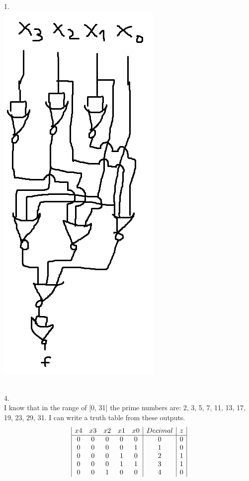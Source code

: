 \documentclass[a4paper, 20pt]{article}
\begin{document}
\begin{question}{1.}
\\ 
\leavevmode{}\hbox{\includegraphics[scale=0.75]{3d.jpg}}
\newpage

\newpage
\\ 4.
\\ I know that in the range of [0, 31] the prime numbers are:  2, 3, 5, 7, 11, 13, 17, 19, 23, 29, 31. I can write a truth table from these outputs. 
\begin{displaymath}
\begin{array}{|c c c c c|c|c|}
x4&x3&x2&x1&x0&Decimal&z\\
\hline 
0 & 0 & 0 & 0 & 0 & 0&0\\
0 & 0 & 0 & 0 & 1 & 1&0\\
0 & 0 & 0 & 1 & 0 & 2&1\\
0 & 0 & 0 & 1 & 1 &3&1\\
0 & 0 & 1 & 0 & 0 &4&0\\

\end{array}
\end{displaymath}
\end{question}
\end{document}
